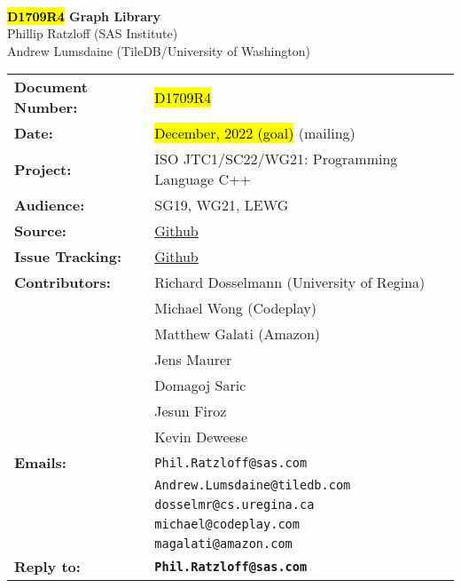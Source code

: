 \documentclass[10pt,onecolumn]{article}
\begin{document}
\begin{titlepage}
~
\vfill
\begin{center}
\LARGE
\textbf{\hl{D1709R4} Graph Library}\\
\vspace{12pt}
\normalsize
	Phillip Ratzloff (SAS Institute)\\
	Andrew Lumsdaine (TileDB/University of Washington)\\
\end{center}
\vspace{32pt}
\begin{tabular}{ll}
\textbf{Document Number:} & \hl{D1709R4} \\
\textbf{Date:} & \hl{December, 2022 (goal)} (mailing)\\ 
\textbf{Project:} & ISO JTC1/SC22/WG21: Programming Language C++\\
\textbf{Audience:} & SG19, WG21, LEWG\\
\textbf{Source:} & \href{https://github.com/stdgraph/graph-v2}{Github} \\
\textbf{Issue Tracking:} & \href{https://github.com/stdgraph/graph-v2/issues}{Github} \\
\textbf{Contributors:}
	&Richard Dosselmann (University of Regina)\\
	&Michael Wong (Codeplay)\\
	&Matthew Galati (Amazon)\\	
	&Jens Maurer\\
	&Domagoj Saric\\
	&Jesun Firoz\\
	&Kevin Deweese\\
\textbf{Emails:}
	&\texttt{Phil.Ratzloff@sas.com}\\
	&\texttt{Andrew.Lumsdaine@tiledb.com}\\
	&\texttt{dosselmr@cs.uregina.ca}\\
	&\texttt{michael@codeplay.com}\\
	&\texttt{magalati@amazon.com}\\
\textbf{Reply to:}
	&\texttt{\textbf{Phil.Ratzloff@sas.com}}\\
\end{tabular}
\vfill
~
\end{titlepage}

\tableofcontents

\clearpage





% 








\footnotesize


\normalsize
\end{document}
